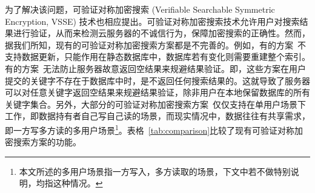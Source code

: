 为了解决该问题，可验证对称加密搜索 (Verifiable Searchable Symmetric Encryption, VSSE) 技术也相应提出\cite{kamara2011cs2,kurosawa2012uc,chai2012verifiable,kurosawa2013update,stefanov2014practical,cheng2015verifiable,bost2016verifiable,ogataefficient}。可验证对称加密搜索技术允许用户对搜索结果进行验证，从而来检测云服务器的不诚信行为，保障加密搜索的正确性。然而，据我们所知，现有的可验证对称加密搜索方案都是不完善的。例如，有的方案~\cite{kurosawa2012uc,chai2012verifiable,cheng2015verifiable,ogataefficient}不支持数据更新，只能作用在静态数据库中，数据库若有变化则需要重建整个索引。有的方案~\cite{kamara2011cs2,kurosawa2013update,stefanov2014practical}无法防止服务器故意返回空结果来规避结果验证。即，这些方案\cite{kamara2011cs2,kurosawa2013update,stefanov2014practical}在用户提交的关键字不存在于数据库中时，是不返回任何搜索结果的。这就导致了服务器可以对任意关键字返回空结果来规避结果验证，除非用户在本地保留数据库的所有关键字集合。另外，大部分的可验证对称加密搜索方案~\cite{kamara2011cs2,kurosawa2012uc,chai2012verifiable,kurosawa2013update,stefanov2014practical,
cheng2015verifiable,ogataefficient,bost2016verifiable}仅仅支持在单用户场景下工作，即数据持有者自己写自己读的场景，而现实情况中，数据往往有共享需求，即一方写多方读的多用户场景\footnote{本文所述的多用户场景指一方写入，多方读取的场景，下文中若不做特别说明，均指这种情况。}。表格~\ref{tab:comparison}比较了现有可验证对称加密搜索方案的功能。


